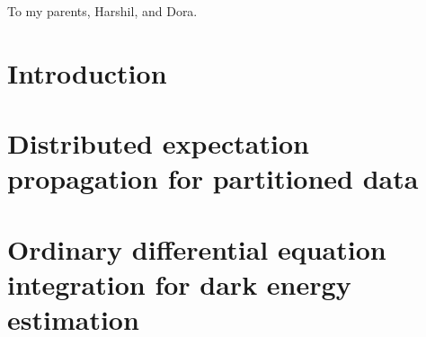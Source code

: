 \documentclass[12pt,openright,oneside,letterpaper,onecolumn]{report}
\begin{document}

\pagestyle{empty}
\thesistitlepage
\thesiscopyrightpage
\thesisabstract


\pagestyle{plain}
\setlength{\footskip}{0.5in}
\setcounter{tocdepth}{2}
\renewcommand{\contentsname}{Table of Contents}

\tableofcontents
\clearpage


\listoffigures
\clearpage



\cleardoublepage


\thispagestyle{plain}
 \strut \vfill
\centerline{\LARGE
To my parents, Harshil, and Dora. }
\vfill \strut
 \cleardoublepage
 

\pagestyle{headings}
\setlength{\textheight}{8.5in}
\setlength{\footskip}{0in}

 {
\fancyhf{}
\fancyhead[LE,RO]{\thepage}
\fancyhead[RE,LO]{\itshape \leftmark}
\renewcommand{\headrulewidth}{0pt}
}
\pagestyle{plain}


\chapter{Introduction}


\chapter{Distributed expectation propagation for partitioned data}
\label{chap:ep}






\chapter{Ordinary differential equation integration for dark energy estimation}
\label{chap:ode}





\end{document}
